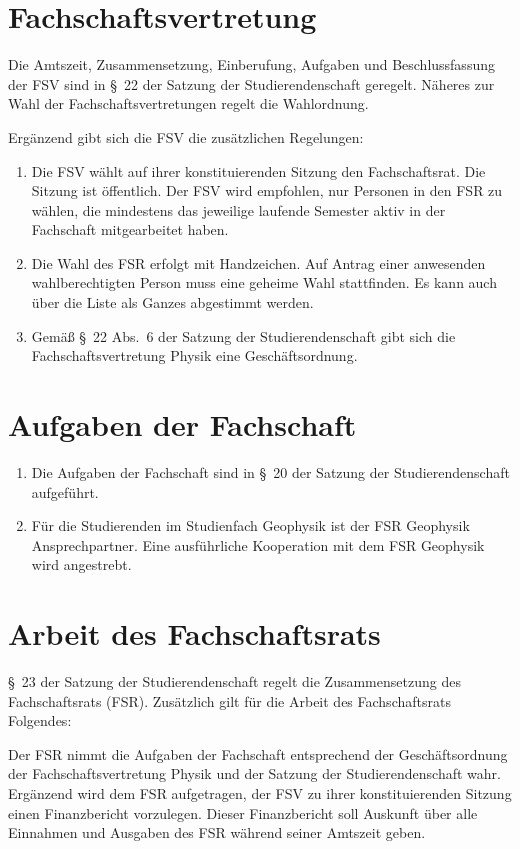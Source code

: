 \documentclass[
	a4paper,
	12pt,
	oneside,
	parskip=half-,
	pagesize,
	headsepline,
	german,
	ngerman
]{scrartcl}
\begin{document}
\section{Fachschaftsvertretung}
Die Amtszeit, Zusammensetzung, Einberufung, Aufgaben und Beschlussfassung der FSV sind in §~22 der Satzung der Studierendenschaft geregelt. Näheres zur Wahl der Fachschaftsvertretungen regelt die Wahlordnung.

Ergänzend gibt sich die FSV die zusätzlichen Regelungen:
\begin{enumerate}
	\item Die FSV wählt auf ihrer konstituierenden Sitzung den Fachschaftsrat. Die Sitzung ist öffentlich. Der FSV wird empfohlen, nur Personen in den FSR zu wählen, die mindestens das jeweilige laufende Semester aktiv in der Fachschaft mitgearbeitet haben.
	\item Die Wahl des FSR erfolgt mit Handzeichen. Auf Antrag einer anwesenden wahlberechtigten Person muss eine geheime Wahl stattfinden. Es kann auch über die Liste als Ganzes abgestimmt werden.
	\item Gemäß §~22 Abs.~6 der Satzung der Studierendenschaft gibt sich die Fachschaftsvertretung Physik eine Geschäftsordnung.
\end{enumerate}

\section{Aufgaben der Fachschaft}
\begin{enumerate}
	\item Die Aufgaben der Fachschaft sind in §~20 der Satzung der Studierendenschaft aufgeführt.
	\item Für die Studierenden im Studienfach Geophysik ist der FSR Geophysik Ansprechpartner. Eine ausführliche Kooperation mit dem FSR Geophysik wird angestrebt.
\end{enumerate}

\section{Arbeit des Fachschaftsrats}
§~23 der Satzung der Studierendenschaft regelt die Zusammensetzung des Fachschaftsrats (FSR). Zusätzlich gilt für die Arbeit des Fachschaftsrats Folgendes:

Der FSR nimmt die Aufgaben der Fachschaft entsprechend der Geschäftsordnung der Fachschaftsvertretung Physik und der Satzung der Studierendenschaft wahr. Ergänzend wird dem FSR aufgetragen, der FSV zu ihrer konstituierenden Sitzung einen Finanzbericht vorzulegen. Dieser Finanzbericht soll Auskunft über alle Einnahmen und Ausgaben des FSR während seiner Amtszeit geben.
\end{document}
